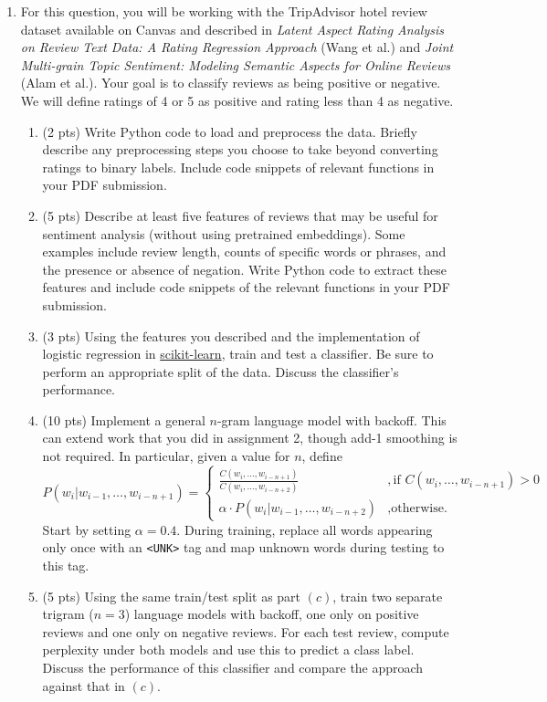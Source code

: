 \documentclass{article}
\begin{document}
\begin{enumerate}
    \item For this question, you will be working with the TripAdvisor hotel review dataset available on Canvas and described in \emph{Latent Aspect Rating Analysis on Review Text Data: A Rating Regression Approach} (Wang et al.) and \emph{Joint Multi-grain Topic Sentiment: Modeling Semantic Aspects for Online Reviews} (Alam et al.). Your goal is to classify reviews as being positive or negative. We will define ratings of 4 or 5 as positive and rating less than 4 as negative.
    \begin{enumerate}
        \item (2 pts) Write Python code to load and preprocess the data. Briefly describe any preprocessing steps you choose to take beyond converting ratings to binary labels. Include code snippets of relevant functions in your PDF submission.
        \item (5 pts) Describe at least five features of reviews that may be useful for sentiment analysis (without using pretrained embeddings). Some examples include review length, counts of specific words or phrases, and the presence or absence of negation. Write Python code to extract these features and include code snippets of the relevant functions in your PDF submission.
        \item (3 pts) Using the features you described and the implementation of logistic regression in \href{https://scikit-learn.org/stable/modules/generated/sklearn.linear_model.LogisticRegression.html}{scikit-learn}, train and test a classifier. Be sure to perform an appropriate split of the data. Discuss the classifier's performance.
        \item (10 pts) Implement a general $n$-gram language model with backoff. This can extend work that you did in assignment 2, though add-1 smoothing is not required. In particular, given a value for $n$, define
        \begin{equation*}
            P(w_i | w_{i-1}, \dots, w_{i-n+1}) = \begin{cases}
                \frac{C(w_i, \dots, w_{i-n+1})}{C(w_i, \dots, w_{i-n+2})} &, \text{if } C(w_i, \dots, w_{i-n+1}) > 0 \\
                \alpha \cdot P(w_i |  w_{i-1}, \dots, w_{i-n+2}) &, \text{otherwise.}
            \end{cases}
        \end{equation*}
        Start by setting $\alpha = 0.4$. During training, replace all words appearing only once with an \verb|<UNK>| tag and map unknown words during testing to this tag.
        \item (5 pts) Using the same train/test split as part $(c)$, train two separate trigram ($n=3$) language models with backoff, one only on positive reviews and one only on negative reviews. For each test review, compute perplexity under both models and use this to predict a class label. Discuss the performance of this classifier and compare the approach against that in $(c)$.
    \end{enumerate}


\end{enumerate}
\end{document}
